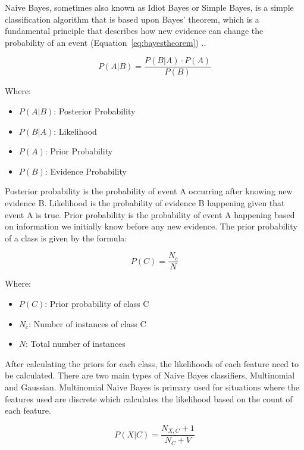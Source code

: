Naive Bayes, sometimes also known as Idiot Bayes or Simple Bayes, is a simple classification algorithm that is based upon Bayes' theorem, which is a fundamental principle that describes how new evidence can change the probability of an event (Equation~\ref{eq:bayestheorem}) .\cite{lowdNaiveBayesModels2005}. 

\begin{equation}
    \label{eq:bayestheorem}
    P(A|B) = \frac{P(B|A) \cdot P(A)}{P(B)}
\end{equation}

Where:
\begin{itemize}
    \item $P(A|B)$: Posterior Probability
    \item $P(B|A)$: Likelihood
    \item $P(A)$: Prior Probability
    \item $P(B)$: Evidence Probability 
\end{itemize} 

Posterior probability is the probability of event A occurring after knowing new evidence B. Likelihood is the probability of evidence B happening given that event A is true. Prior probability is the probability of event A happening based on information we initially know before any new evidence. The prior probability of a class is given by the formula:

\begin{equation}
    \label{eq:prior}
    P(C) = \frac{N_c}{N}
\end{equation}

Where:
\begin{itemize}
    \item $P(C)$: Prior probability of class C
    \item $N_c$: Number of instances of class C
    \item $N$: Total number of instances
\end{itemize}

After calculating the priors for each class, the likelihoods of each feature need to be calculated. There are two main types of Naive Bayes classifiers, Multinomial and Gaussian. Multinomial Naive Bayes is primary used for situations where the features used are discrete which calculates the likelihood based on the count of each feature.

\begin{equation}
    \label{eq:multinomial}
    P(X | C) = \frac{N_{X,C} + 1}{N_C + V}
\end{equation}

